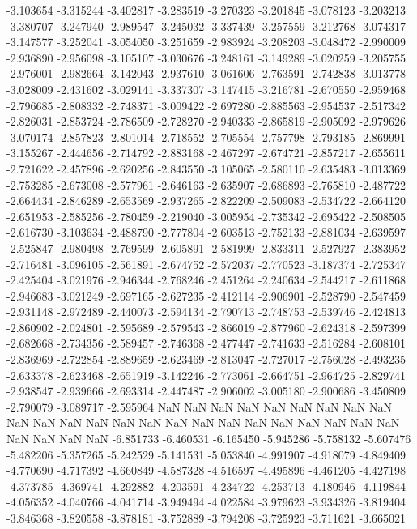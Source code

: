 -3.103654
-3.315244
-3.402817
-3.283519
-3.270323
-3.201845
-3.078123
-3.203213
-3.380707
-3.247940
-2.989547
-3.245032
-3.337439
-3.257559
-3.212768
-3.074317
-3.147577
-3.252041
-3.054050
-3.251659
-2.983924
-3.208203
-3.048472
-2.990009
-2.936890
-2.956098
-3.105107
-3.030676
-3.248161
-3.149289
-3.020259
-3.205755
-2.976001
-2.982664
-3.142043
-2.937610
-3.061606
-2.763591
-2.742838
-3.013778
-3.028009
-2.431602
-3.029141
-3.337307
-3.147415
-3.216781
-2.670550
-2.959468
-2.796685
-2.808332
-2.748371
-3.009422
-2.697280
-2.885563
-2.954537
-2.517342
-2.826031
-2.853724
-2.786509
-2.728270
-2.940333
-2.865819
-2.905092
-2.979626
-3.070174
-2.857823
-2.801014
-2.718552
-2.705554
-2.757798
-2.793185
-2.869991
-3.155267
-2.444656
-2.714792
-2.883168
-2.467297
-2.674721
-2.857217
-2.655611
-2.721622
-2.457896
-2.620256
-2.843550
-3.105065
-2.580110
-2.635483
-3.013369
-2.753285
-2.673008
-2.577961
-2.646163
-2.635907
-2.686893
-2.765810
-2.487722
-2.664434
-2.846289
-2.653569
-2.937265
-2.822209
-2.509083
-2.534722
-2.664120
-2.651953
-2.585256
-2.780459
-2.219040
-3.005954
-2.735342
-2.695422
-2.508505
-2.616730
-3.103634
-2.488790
-2.777804
-2.603513
-2.752133
-2.881034
-2.639597
-2.525847
-2.980498
-2.769599
-2.605891
-2.581999
-2.833311
-2.527927
-2.383952
-2.716481
-3.096105
-2.561891
-2.674752
-2.572037
-2.770523
-3.187374
-2.725347
-2.425404
-3.021976
-2.946344
-2.768246
-2.451264
-2.240634
-2.544217
-2.611868
-2.946683
-3.021249
-2.697165
-2.627235
-2.412114
-2.906901
-2.528790
-2.547459
-2.931148
-2.972489
-2.440073
-2.594134
-2.790713
-2.748753
-2.539746
-2.424813
-2.860902
-2.024801
-2.595689
-2.579543
-2.866019
-2.877960
-2.624318
-2.597399
-2.682668
-2.734356
-2.589457
-2.746368
-2.477447
-2.741633
-2.516284
-2.608101
-2.836969
-2.722854
-2.889659
-2.623469
-2.813047
-2.727017
-2.756028
-2.493235
-2.633378
-2.623468
-2.651919
-3.142246
-2.773061
-2.664751
-2.964725
-2.829741
-2.938547
-2.939666
-2.693314
-2.447487
-2.906002
-3.005180
-2.900686
-3.450809
-2.790079
-3.089717
-2.595964
NaN
NaN
NaN
NaN
NaN
NaN
NaN
NaN
NaN
NaN
NaN
NaN
NaN
NaN
NaN
NaN
NaN
NaN
NaN
NaN
NaN
NaN
NaN
NaN
NaN
NaN
NaN
NaN
-6.851733
-6.460531
-6.165450
-5.945286
-5.758132
-5.607476
-5.482206
-5.357265
-5.242529
-5.141531
-5.053840
-4.991907
-4.918079
-4.849409
-4.770690
-4.717392
-4.660849
-4.587328
-4.516597
-4.495896
-4.461205
-4.427198
-4.373785
-4.369741
-4.292882
-4.203591
-4.234722
-4.253713
-4.180946
-4.119844
-4.056352
-4.040766
-4.041714
-3.949494
-4.022584
-3.979623
-3.934326
-3.819404
-3.846368
-3.820558
-3.878181
-3.752889
-3.794208
-3.725923
-3.711621
-3.665021
